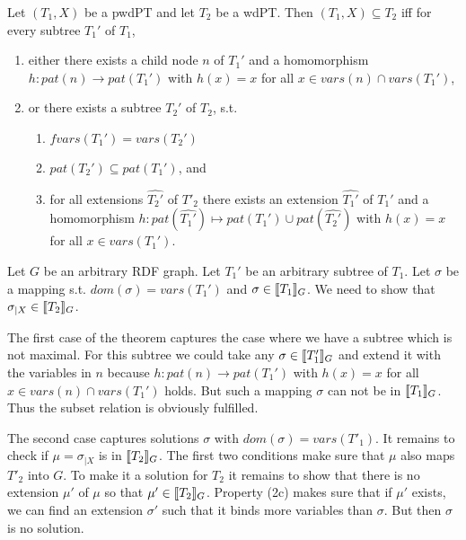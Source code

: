 \begin{theorem}\label{projwd}\cite{pichler2014containment}
	Let $(T_1,X)$ be a pwdPT and let $T_2$ be a wdPT. Then $(T_1,X) \subseteq
	T_2$ iff for every subtree $T_1'$ of $T_1$,
	\begin{enumerate}
		\item either there exists a child node $n$ of $T_1'$ and a homomorphism
			$h:pat(n) \rightarrow pat(T_1')$ with $h(x) = x$ for all $x \in
			vars(n) \cap vars(T_1')$,
		\item or there exists a subtree $T_2'$ of $T_2$, s.t.
			\begin{enumerate}
				\item $fvars(T_1') = vars(T_2')$
				\item $pat(T_2') \subseteq pat(T_1')$, and
				\item for all extensions $\hat{T_2'}$ of $T'_2$ there exists an
					extension $\hat{T_1'}$ of $T_1'$ and a homomorphism 
					$h: pat(\hat{T_1'}) \mapsto pat(T_1') \cup pat(\hat{T_2'})$
					with $h(x) = x$ for all $x \in vars (T_1')$.
			\end{enumerate}
	\end{enumerate}
\end{theorem}
\begin{proofidea}
Let $G$ be an arbitrary RDF graph. Let $T_1'$ be an arbitrary subtree
of $T_1$. Let $\sigma$ be a mapping s.t. $dom(\sigma) = vars(T_1')$ and $\sigma
\in \llbracket T_1 \rrbracket_G$. We need to show that $\sigma_{|X} \in \llbracket T_2 \rrbracket_G$.

The first case of the theorem captures the case where we have a subtree which is
not maximal. For this subtree we could take any $\sigma
\in \llbracket T_1' \rrbracket_G$ and extend it with the variables in $n$ because  
$h:pat(n) \rightarrow pat(T_1')$ with $h(x) = x$ for all $x \in
vars(n) \cap vars(T_1')$ holds. But such a mapping $\sigma$ can not be in $\llbracket
T_1 \rrbracket_G$. Thus the subset relation is obviously fulfilled.

The second case captures solutions $\sigma$ with $dom(\sigma) = vars(T'_1)$.
It remains to check if $\mu = \sigma_{|X}$ is in $\llbracket T_2\rrbracket_G$.
The first two conditions make sure that $\mu$ also maps $T'_2$ into $G$. To make
it a solution for $T_2$ it remains to show that there is no extension $\mu'$ of $\mu$
so that $\mu' \in \llbracket T_2\rrbracket_G$. Property (2c) makes sure that if $\mu'$ exists,
we can find an extension $\sigma'$ such that it binds more variables than
$\sigma$. But then $\sigma$ is no solution.
\end{proofidea}

